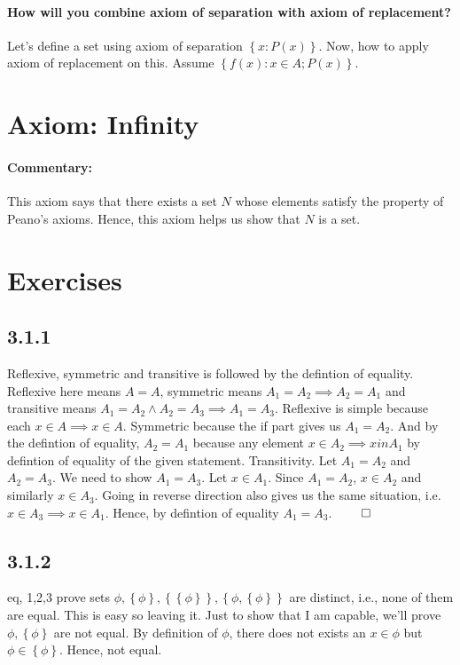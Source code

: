 \documentclass{report}
\begin{document}
\paragraph*{How will you combine axiom of separation with axiom of replacement?} Let's define a set using axiom of separation $\left\{ x:P(x) \right\} $. Now, how to apply axiom of replacement on this. Assume $\left\{ f(x): x \in A; P(x) \right\} $. 

\section{Axiom: Infinity}
\paragraph{Commentary: }This axiom says that there exists a set $N$ whose elements satisfy the property of Peano's axioms. Hence,  this axiom helps us show that $N$ is a set.

\section*{Exercises}
\subsection*{3.1.1} Reflexive, symmetric and transitive is followed by the defintion of equality. Reflexive here means $A = A$, symmetric means  $A_1 = A_2 \implies A_2 = A_1$ and transitive means $A_1 = A_2 \land A_2 = A_3 \implies A_1 = A_3$.
Reflexive is simple because each  $x \in A \implies x \in A$. Symmetric because the if part gives us $A_1 = A_2$. And by the defintion of equality, $A_2 = A_1$ because any element $x \in A_2 \implies x in A_1$ by defintion of equality of the given statement. Transitivity. Let $A_1 = A_2$ and $A_2 = A_3$. We need to show $A_1= A_3$. Let  $x \in A_1$. Since $A_1 = A_2$, $x \in A_2$ and similarly $x \in A_3$. Going in reverse direction also gives us the same situation, i.e.  $x \in A_3 \implies x \in A_1$. Hence, by defintion of equality $A_1 = A_3$. $\qed$
 
\subsection*{3.1.2}
eq, 1,2,3 prove sets  $\phi, \left\{ \phi \right\} , \left\{ \left\{ \phi \right\}  \right\}, \left\{ \phi, \left\{ \phi \right\}  \right\}  $ are distinct, i.e., none of them are equal. This is easy so leaving it.
Just to show that I am capable, we'll prove $\phi, \left\{ \phi \right\} $ are not equal. By definition of $\phi$, there does not exists an  $x \in \phi$ but  $\phi \in \left\{ \phi \right\} $. Hence, not equal.  
\end{document}
